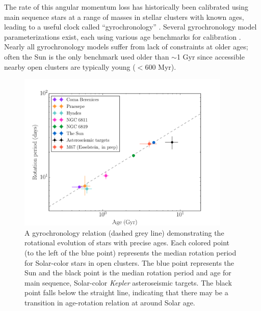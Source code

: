\documentclass[12pt]{article}
\newcommand{\Kepler}{\textsl{Kepler}\xspace}
\newcommand{\eg}{{\it e.g.}}
\begin{document}
The rate of this angular momentum loss has historically been calibrated using
main sequence stars at a range of masses in stellar clusters with known ages,
leading to a useful clock called ``gyrochronology'' \citep{barnes2003}.
Several gyrochronology model parameterizations exist, each using various age
benchmarks for calibration \citep[\eg][]{barnes2007, barnes2010, mamajek2008,angus2015, Matt2012, van-saders2013, van-saders2016}.
Nearly all gyrochronology models suffer from lack of constraints at older
ages; often the Sun is the only benchmark used older than $\sim$1 Gyr since
accessible nearby open clusters are typically young ($<600$ Myr).

\begin{figure}[!t]
\centering
\includegraphics[width=4in]{AAS_talk_M67_astero.pdf}
    \caption{A gyrochronology relation (dashed grey line) demonstrating the
    rotational evolution of stars with precise ages.
    Each colored point (to the left of the blue point) represents the median
    rotation period for Solar-color stars in open clusters.
    The blue point represents the Sun and the black point is the median
    rotation period and age for main sequence, Solar-color \Kepler
    asteroseismic targets.
    The black point falls below the straight line, indicating that there may
    be a transition in age-rotation relation at around Solar age.}
\label{fig:gyro}
\end{figure}
\end{document}
